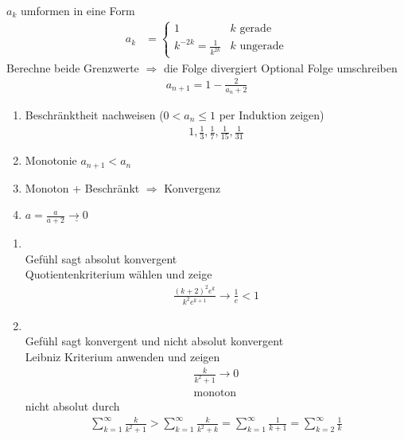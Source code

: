 \begin{enumerate}[label=Aufgabe \arabic*:, , leftmargin=*]
    $a_k$ umformen in eine Form
    \begin{align*}
        a_k &= \begin{cases}
        1 & k \text{ gerade}\\
        k^{-2k} = \frac{1}{k^{2k}} & k \text{ ungerade}
        \end{cases}
    \end{align*}
    Berechne beide Grenzwerte $\Rightarrow$ die Folge divergiert
    Optional Folge umschreiben 
    \begin{align*}
        a_{n+1} = 1 - \frac{2}{a_n + 2}
    \end{align*}
    \begin{enumerate}[label=\arabic*)]
        \item Beschränktheit nachweisen ($0 < a_n \leq 1$ per Induktion zeigen)
        \begin{align*}
            1, \frac{1}{3}, \frac{1}{7}, \frac{1}{15}, \frac{1}{31}
        \end{align*}
        \item Monotonie $a_{n + 1} < a_n$
        \item Monoton + Beschränkt $\Rightarrow$ Konvergenz
        \item $a = \frac{a}{a +2} \underline{\rightarrow 0}$
    \end{enumerate}
    \begin{enumerate}[label=\alph*)]
        \item \textbf{}\\%
        Gefühl sagt absolut konvergent\\
        Quotientenkriterium wählen und zeige 
        \begin{align*}
            \frac{(k + 2) ^2 e ^k}{k^2 e^{k+1}} \rightarrow \frac{1}{e} < 1
        \end{align*}
        \item \textbf{}\\%
        Gefühl sagt konvergent und nicht absolut konvergent\\
        Leibniz Kriterium anwenden und zeigen
        \begin{align*}
            \frac{k}{k^2 + 1} \rightarrow 0 \\
            \text{monoton}
        \end{align*}
        nicht absolut durch
        \begin{align*}
            \sum_{k = 1}^\infty \frac{k}{k^2 +1} > \sum_{k = 1}^\infty \frac{k}{k^2 + k} = \sum_{k = 1}^\infty \frac{1}{k+1} = \sum_{k = 2}^\infty \frac{1}{k}

\end{align*}
\end{enumerate}
\end{enumerate}
